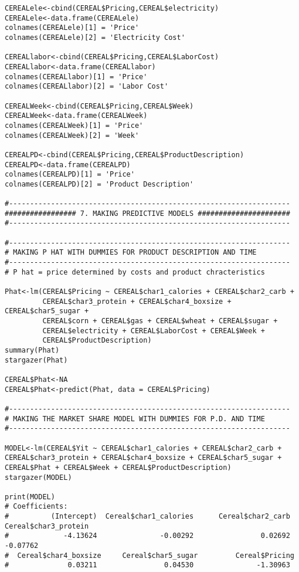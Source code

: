 \documentclass[12pt,english]{article}
\begin{document}
\begin{lstlisting}
CEREALele<-cbind(CEREAL$Pricing,CEREAL$electricity)
CEREALele<-data.frame(CEREALele)
colnames(CEREALele)[1] = 'Price'
colnames(CEREALele)[2] = 'Electricity Cost'

CEREALlabor<-cbind(CEREAL$Pricing,CEREAL$LaborCost)
CEREALlabor<-data.frame(CEREALlabor)
colnames(CEREALlabor)[1] = 'Price'
colnames(CEREALlabor)[2] = 'Labor Cost'

CEREALWeek<-cbind(CEREAL$Pricing,CEREAL$Week)
CEREALWeek<-data.frame(CEREALWeek)
colnames(CEREALWeek)[1] = 'Price'
colnames(CEREALWeek)[2] = 'Week'

CEREALPD<-cbind(CEREAL$Pricing,CEREAL$ProductDescription)
CEREALPD<-data.frame(CEREALPD)
colnames(CEREALPD)[1] = 'Price'
colnames(CEREALPD)[2] = 'Product Description'
  
#-------------------------------------------------------------------
################# 7. MAKING PREDICTIVE MODELS ######################
#-------------------------------------------------------------------

#-------------------------------------------------------------------
# MAKING P HAT WITH DUMMIES FOR PRODUCT DESCRIPTION AND TIME
#-------------------------------------------------------------------
# P hat = price determined by costs and product chracteristics

Phat<-lm(CEREAL$Pricing ~ CEREAL$char1_calories + CEREAL$char2_carb + 
         CEREAL$char3_protein + CEREAL$char4_boxsize + CEREAL$char5_sugar +
         CEREAL$corn + CEREAL$gas + CEREAL$wheat + CEREAL$sugar + 
         CEREAL$electricity + CEREAL$LaborCost + CEREAL$Week +
         CEREAL$ProductDescription)
summary(Phat)
stargazer(Phat)

CEREAL$Phat<-NA
CEREAL$Phat<-predict(Phat, data = CEREAL$Pricing)           
               
#-------------------------------------------------------------------
# MAKING THE MARKET SHARE MODEL WITH DUMMIES FOR P.D. AND TIME
#-------------------------------------------------------------------

MODEL<-lm(CEREAL$Yit ~ CEREAL$char1_calories + CEREAL$char2_carb + 
CEREAL$char3_protein + CEREAL$char4_boxsize + CEREAL$char5_sugar +
CEREAL$Phat + CEREAL$Week + CEREAL$ProductDescription)
stargazer(MODEL)

print(MODEL)
# Coefficients:
#          (Intercept)  Cereal$char1_calories      Cereal$char2_carb   Cereal$char3_protein  
#             -4.13624               -0.00292                0.02692               -0.07762  
#  Cereal$char4_boxsize     Cereal$char5_sugar         Cereal$Pricing  
#              0.03211                0.04530               -1.30963 

\end{lstlisting}
\end{document}
